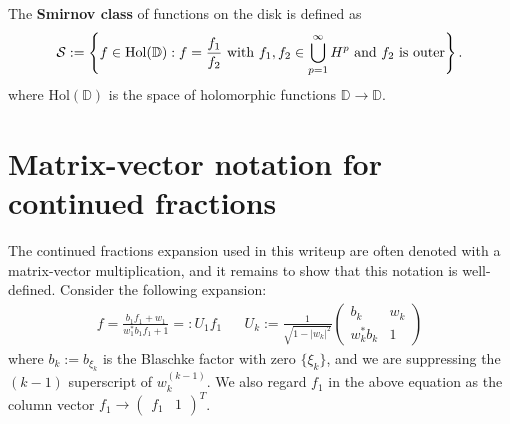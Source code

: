 \begin{appendices}

The \textbf{Smirnov class} of functions on the disk is defined as
\begin{equation}
    \mathcal S := \left\{ f\in\mathrm{Hol}(\mathbb D) : f = \frac{f_1}{f_2} \textnormal{ with } f_1, f_2\in\bigcup_{p = 1}^\infty H^p \textnormal{ and $f_2$ is outer} \right\}.
\end{equation}
where $\mathrm{Hol}(\mathbb D)$ is the space of holomorphic functions $\mathbb D \rightarrow\mathbb D$. 




\section{Matrix-vector notation for continued fractions}

The continued fractions expansion used in this writeup are often denoted with a matrix-vector multiplication, and it remains to show that this notation is well-defined. Consider the following expansion:
\begin{align}
    f = \frac{b_1 f_1 + w_1}{w_1^* b_1 f_1 + 1} =: U_1 f_1 &&
    U_k := \frac{1}{\sqrt{1 - |w_k|^2}} \begin{pmatrix}
        b_k & w_k \\ w_k^* b_k & 1
    \end{pmatrix}
    \label{eq:matrix_vector_notation}
\end{align}
where $b_k := b_{\xi_k}$ is the Blaschke factor with zero $\{\xi_k\}$, and we are suppressing the $(k-1)$ superscript of $w_k^{(k-1)}$. We also regard $f_1$ in the above equation as the column vector $f_1 \rightarrow \begin{pmatrix}
    f_1 & 1
\end{pmatrix}^T$. 


\end{appendices}
